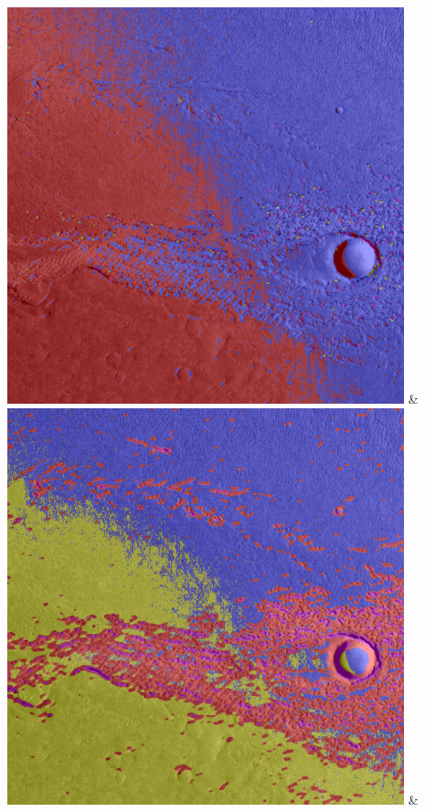 \begin{table}[h!]
\begin{tabularx}{\textwidth}
		\includegraphics[width=0.9\linewidth]{images/gen/filter_size/p03_02.png_0.25.png} &
		\includegraphics[width=0.9\linewidth]{images/gen/filter_size/p03_02.png_0.50.png} &

\end{tabularx}
\end{table}
